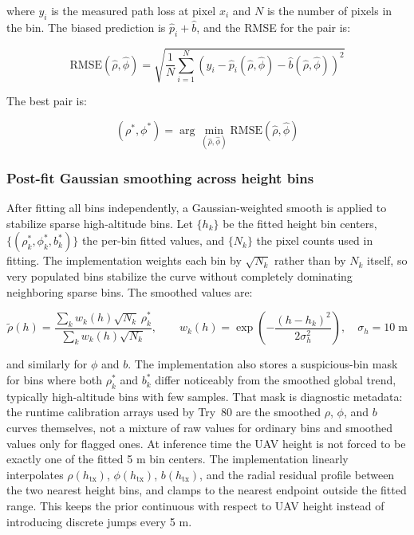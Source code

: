 where $y_i$ is the measured path loss at pixel $x_i$ and $N$ is the number
of pixels in the bin. The biased prediction is $\hat p_i + \hat b$, and the
RMSE for the pair is:

\begin{equation}
\mathrm{RMSE}(\hat\rho, \hat\phi)
=
\sqrt{\frac{1}{N}\sum_{i=1}^{N}
\left(y_i - \hat p_i(\hat\rho,\hat\phi) - \hat b(\hat\rho,\hat\phi)\right)^2}
\label{eq:rmse_grid}
\end{equation}

The best pair is:

\begin{equation}
(\rho^*, \phi^*)
= \arg\min_{(\hat\rho, \hat\phi)}
\mathrm{RMSE}(\hat\rho, \hat\phi)
\end{equation}

\subsubsection{Post-fit Gaussian smoothing across height bins}

After fitting all bins independently, a Gaussian-weighted smooth is applied
to stabilize sparse high-altitude bins. Let $\{h_k\}$ be the fitted height
bin centers, $\{(\rho_k^*, \phi_k^*, b_k^*)\}$ the per-bin fitted values,
and $\{N_k\}$ the pixel counts used in fitting. The implementation weights
each bin by $\sqrt{N_k}$ rather than by $N_k$ itself, so very populated bins
stabilize the curve without completely dominating neighboring sparse bins.
The smoothed values are:

\begin{equation}
\tilde\rho(h)
=
\frac{\sum_k w_k(h)\sqrt{N_k}\,\rho_k^*}{\sum_k w_k(h)\sqrt{N_k}},
\qquad
w_k(h) = \exp\!\left(-\frac{(h - h_k)^2}{2\sigma_h^2}\right),
\quad \sigma_h = 10\;\mathrm{m}
\label{eq:gauss_smooth}
\end{equation}

and similarly for $\phi$ and $b$. The implementation also stores a
suspicious-bin mask for bins where both $\rho_k^*$ and $b_k^*$ differ
noticeably from the smoothed global trend, typically high-altitude bins with
few samples. That mask is diagnostic metadata: the runtime calibration arrays
used by Try~80 are the smoothed $\rho$, $\phi$, and $b$ curves themselves, not
a mixture of raw values for ordinary bins and smoothed values only for flagged
ones.
At inference time the UAV height is not forced to be exactly one of the fitted
5 m bin centers. The implementation linearly interpolates $\rho(h_{\mathrm{tx}})$,
$\phi(h_{\mathrm{tx}})$, $b(h_{\mathrm{tx}})$, and the radial residual profile
between the two nearest height bins, and clamps to the nearest endpoint outside
the fitted range. This keeps the prior continuous with respect to UAV height
instead of introducing discrete jumps every 5 m.

